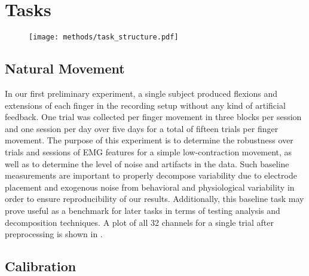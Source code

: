 \documentclass[../main.tex]{subfiles}
\begin{document}
\section[]{Tasks}

\begin{figure}[tph]
  \centering
    \texttt{[image: methods/task\_structure.pdf]}
    \caption[Movement task visual feedback]{}\label{fig:movement_task_screen}
  \end{figure}


\subsection{Natural Movement}

In our first preliminary experiment, a single subject produced flexions and extensions of each finger in the recording setup without any kind of artificial feedback. One trial was collected per finger movement in three blocks per session and one session per day over five days for a total of fifteen trials per finger movement. The purpose of this experiment is to determine the robustness over trials and sessions of EMG features for a simple low-contraction movement, as well as to determine the level of noise and artifacts in the data. Such baseline measurements are important to properly decompose variability due to electrode placement and exogenous noise from behavioral and physiological variability in order to ensure reproducibility of our results. Additionally, this baseline task may prove useful as a benchmark for later tasks in terms of testing analysis and decomposition techniques. A plot of all 32 channels for a single trial after preprocessing is shown in .




\subsection{Calibration}
\end{document}
